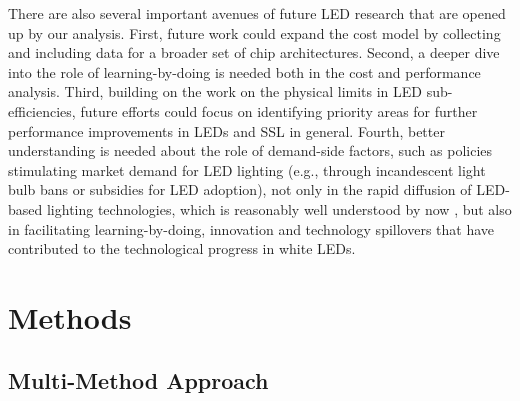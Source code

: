 \documentclass[parskip=full]{article}
\begin{document}
There are also several important avenues of future LED research that are opened up by our analysis. First, future work could expand the cost model by collecting and including data for a broader set of chip architectures. Second, a deeper dive into the role of learning-by-doing is needed both in the cost and performance analysis. Third, building on the work on the physical limits in LED sub-efficiencies, future efforts could focus on identifying priority areas for further performance improvements in LEDs and SSL in general. Fourth, better understanding is needed about the role of demand-side factors, such as policies stimulating market demand for LED lighting (e.g., through incandescent light bulb bans or subsidies for LED adoption), not only in the rapid diffusion of LED-based lighting technologies, which is reasonably well understood by now \cite{Mills2014, Kamat2020, weinold2021quantifying, stegmaier2021incandescent, grubb2021new}, but also in facilitating learning-by-doing, innovation and technology spillovers that have contributed to the technological progress in white LEDs.

\section{Methods}
\label{sec:methods}

\subsection{Multi-Method Approach}
\end{document}
